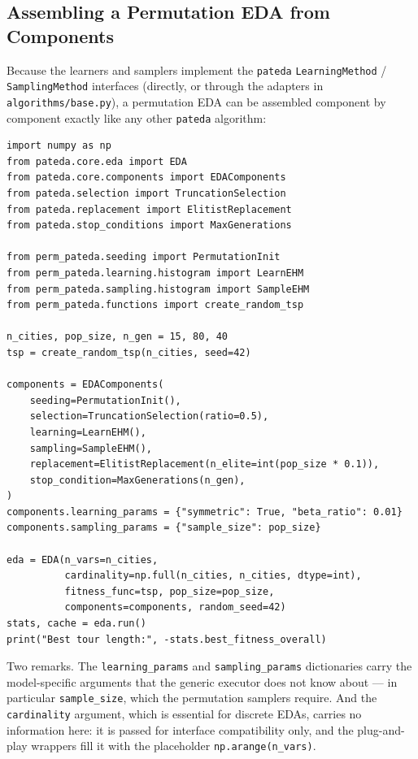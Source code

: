 \documentclass[a4paper,11pt]{article}
\begin{document}
\subsection{Assembling a Permutation EDA from Components}

Because the learners and samplers implement the \texttt{pateda}
\texttt{LearningMethod} / \texttt{SamplingMethod} interfaces (directly, or through
the adapters in \texttt{algorithms/base.py}), a permutation EDA can be assembled
component by component exactly like any other \texttt{pateda} algorithm:

\begin{lstlisting}
import numpy as np
from pateda.core.eda import EDA
from pateda.core.components import EDAComponents
from pateda.selection import TruncationSelection
from pateda.replacement import ElitistReplacement
from pateda.stop_conditions import MaxGenerations

from perm_pateda.seeding import PermutationInit
from perm_pateda.learning.histogram import LearnEHM
from perm_pateda.sampling.histogram import SampleEHM
from perm_pateda.functions import create_random_tsp

n_cities, pop_size, n_gen = 15, 80, 40
tsp = create_random_tsp(n_cities, seed=42)

components = EDAComponents(
    seeding=PermutationInit(),
    selection=TruncationSelection(ratio=0.5),
    learning=LearnEHM(),
    sampling=SampleEHM(),
    replacement=ElitistReplacement(n_elite=int(pop_size * 0.1)),
    stop_condition=MaxGenerations(n_gen),
)
components.learning_params = {"symmetric": True, "beta_ratio": 0.01}
components.sampling_params = {"sample_size": pop_size}

eda = EDA(n_vars=n_cities,
          cardinality=np.full(n_cities, n_cities, dtype=int),
          fitness_func=tsp, pop_size=pop_size,
          components=components, random_seed=42)
stats, cache = eda.run()
print("Best tour length:", -stats.best_fitness_overall)
\end{lstlisting}

Two remarks.  The \texttt{learning\_params} and \texttt{sampling\_params}
dictionaries carry the model-specific arguments that the generic executor does
not know about --- in particular \texttt{sample\_size}, which the permutation
samplers require.  And the \texttt{cardinality} argument, which is essential for
discrete EDAs, carries no information here: it is passed for interface
compatibility only, and the plug-and-play wrappers fill it with the placeholder
\texttt{np.arange(n\_vars)}.
\end{document}
